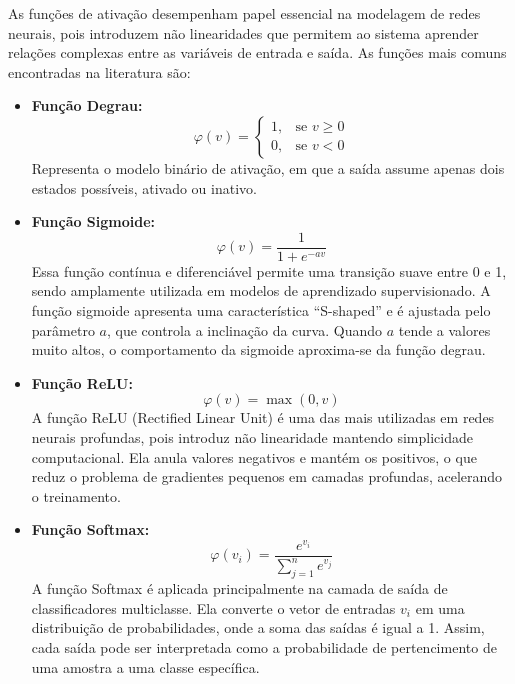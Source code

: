 As funções de ativação desempenham papel essencial na modelagem de redes neurais, pois introduzem não linearidades que permitem ao sistema aprender relações complexas entre as variáveis de entrada e saída. As funções mais comuns encontradas na literatura são:
\begin{itemize}
    \item \textbf{Função Degrau:}
    \begin{equation}
        \varphi(v) = 
        \begin{cases}
        1, & \text{se } v \geq 0 \\
        0, & \text{se } v < 0
        \end{cases}
    \end{equation}
    Representa o modelo binário de ativação, em que a saída assume apenas dois estados possíveis, ativado ou inativo.

    \item \textbf{Função Sigmoide:}
    \begin{equation}
        \varphi(v) = \frac{1}{1 + e^{-a v}}
    \end{equation}
    Essa função contínua e diferenciável permite uma transição suave entre 0 e 1, sendo amplamente utilizada em modelos de aprendizado supervisionado. A função sigmoide apresenta uma característica “S-shaped” e é ajustada pelo parâmetro $a$, que controla a inclinação da curva. Quando $a$ tende a valores muito altos, o comportamento da sigmoide aproxima-se da função degrau.
    
    \item \textbf{Função ReLU:}
    \begin{equation}
        \varphi(v) = \max(0, v)
    \end{equation}
    A função ReLU (Rectified Linear Unit) é uma das mais utilizadas em redes neurais profundas, pois introduz não linearidade mantendo simplicidade computacional. Ela anula valores negativos e mantém os positivos, o que reduz o problema de gradientes pequenos em camadas profundas, acelerando o treinamento.

    \item \textbf{Função Softmax:}
    \begin{equation}
        \varphi(v_i) = \frac{e^{v_i}}{\sum_{j=1}^{n} e^{v_j}}
    \end{equation}
    A função Softmax é aplicada principalmente na camada de saída de classificadores multiclasse. Ela converte o vetor de entradas $v_i$ em uma distribuição de probabilidades, onde a soma das saídas é igual a 1. Assim, cada saída pode ser interpretada como a probabilidade de pertencimento de uma amostra a uma classe específica.
\end{itemize}

